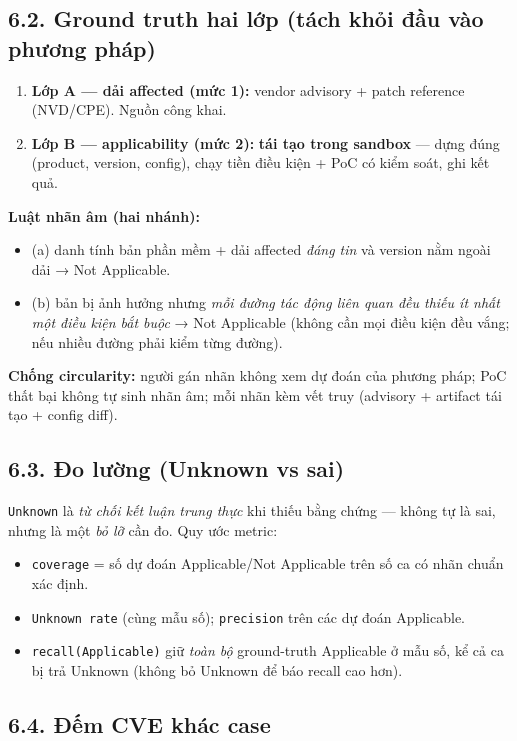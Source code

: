 \documentclass[11pt,a4paper]{article}
\begin{document}
\subsection*{6.2. Ground truth hai lớp (tách khỏi đầu vào phương pháp)}

\begin{enumerate}
  \item \textbf{Lớp A — dải affected (mức 1):} vendor advisory + patch reference (NVD/CPE). Nguồn công khai.
  \item \textbf{Lớp B — applicability (mức 2):} \textbf{tái tạo trong sandbox} — dựng đúng (product, version, config), chạy tiền điều kiện + PoC có kiểm soát, ghi kết quả.
\end{enumerate}

\textbf{Luật nhãn âm (hai nhánh):}
\begin{itemize}
  \item (a) danh tính bản phần mềm + dải affected \emph{đáng tin} và version nằm ngoài dải → Not Applicable.
  \item (b) bản bị ảnh hưởng nhưng \emph{mỗi đường tác động liên quan đều thiếu ít nhất một điều kiện bắt buộc} → Not Applicable (không cần mọi điều kiện đều vắng; nếu nhiều đường phải kiểm từng đường).
\end{itemize}

\textbf{Chống circularity:} người gán nhãn không xem dự đoán của phương pháp; PoC thất bại không tự sinh nhãn âm; mỗi nhãn kèm vết truy (advisory + artifact tái tạo + config diff).

\subsection*{6.3. Đo lường (Unknown vs sai)}

\texttt{Unknown} là \emph{từ chối kết luận trung thực} khi thiếu bằng chứng — không tự là sai, nhưng là một \emph{bỏ lỡ} cần đo. Quy ước metric:
\begin{itemize}
  \item \texttt{coverage} = số dự đoán Applicable/Not Applicable trên số ca có nhãn chuẩn xác định.
  \item \texttt{Unknown rate} (cùng mẫu số); \texttt{precision} trên các dự đoán Applicable.
  \item \texttt{recall(Applicable)} giữ \emph{toàn bộ} ground-truth Applicable ở mẫu số, kể cả ca bị trả Unknown (không bỏ Unknown để báo recall cao hơn).
\end{itemize}

\subsection*{6.4. Đếm CVE khác case}
\end{document}
